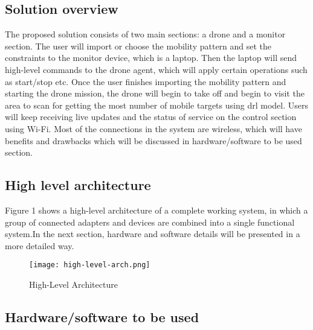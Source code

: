 \documentclass[../main.tex]{subfiles}
\begin{document}
\subsection{Solution overview}

The proposed solution consists of two main sections: a drone and a monitor section. The user will import or choose 
the mobility pattern and set the constraints to the monitor device, which is a laptop. Then the laptop will send high-level commands to the drone agent, which will apply certain operations such as start/stop etc. Once the user finishes importing the mobility pattern and starting the drone mission, the drone will begin to take off and begin to visit the area to scan for getting the most number of mobile targets using \gls{drl} model. Users will keep receiving live updates and the status of service on the control section using Wi-Fi. Most of the connections in the system are wireless, which will have benefits and drawbacks which will be discussed in hardware/software to be used section.


\subsection{High level architecture}
Figure 1 shows a high-level architecture of a complete working system, in which a group of connected adapters and devices are combined into a single functional system.In the next section, hardware and software details will be presented in a more detailed way.
\begin{figure}[H]
	\centering
	\texttt{[image: high-level-arch.png]}
	\caption{High-Level Architecture}\label{fig1:arch-fig}
\end{figure}


\subsection{Hardware/software to be used}
\end{document}

